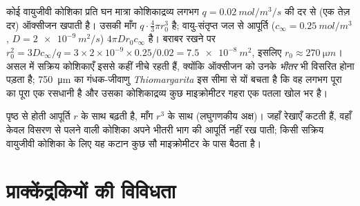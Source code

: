 \begin{example}\label{ex:b2:unicellular-diversity:howbig}
कोई वायुजीवी कोशिका प्रति घन मात्रा कोशिकाद्रव्य लगभग
$q = \qty{0.02}{mol/m^3/s}$ की दर से (एक तेज़ दर) ऑक्सीजन खपाती है। उसकी
माँग $q \cdot \tfrac{4}{3}\pi
r_0^3$ है; वायु-संतृप्त जल से आपूर्ति ($c_\infty =
\qty{0.25}{mol/m^3}$, $D = \qty{2e-9}{m^2/s}$) $4\pi D r_0
c_\infty$ है। बराबर रखने पर $r_0^2 = 3Dc_\infty/q = 3\times 2\times 10^{-9}
\times 0.25/0.02 = \qty{7.5e-8}{m^2}$, इसलिए $r_0 \approx
\qty{270}{\micro m}$। असल में सक्रिय कोशिकाएँ इससे कहीं नीचे रहती हैं,
क्योंकि ऑक्सीजन को उनके \emph{भीतर} भी विसरित होना पड़ता है;
\qty{750}{\micro m} का गंधक-जीवाणु \emph{Thiomargarita} इस सीमा से यों
बचता है कि वह लगभग पूरा का पूरा एक रसधानी है और उसका कोशिकाद्रव्य कुछ
माइक्रोमीटर गहरा एक पतला खोल भर है।
\end{example}

\begin{omfigure}

{\small पृष्ठ से होती आपूर्ति $r$ के साथ बढ़ती है, माँग $r^3$ के साथ
(लघुगणकीय अक्ष)। जहाँ रेखाएँ कटती हैं, वहाँ केवल विसरण से पलने वाली
कोशिका अपने भीतरी भाग की आपूर्ति नहीं रख पाती; किसी सक्रिय वायुजीवी
कोशिका के लिए यह कटान कुछ सौ माइक्रोमीटर के पास बैठता है।}
\end{omfigure}

\section{प्राक्केंद्रकियों की विविधता}

